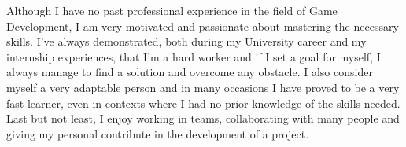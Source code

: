 \begin{cvletter}
      Although I have no past professional experience in the field of Game Development, I am very motivated and passionate about mastering the necessary skills. I've always demonstrated, both during my University career and my internship experiences, that I'm a hard worker and if I set a goal for myself, I always manage to find a solution and overcome any obstacle. I also consider myself a very adaptable person and in many occasions I have proved to be a very fast learner, even in contexts where I had no prior knowledge of the skills needed. Last but not least, I enjoy working in teams, collaborating with many people and giving my personal contribute in the development of a project.
  \end{cvletter}
  
  \makeletterclosing

